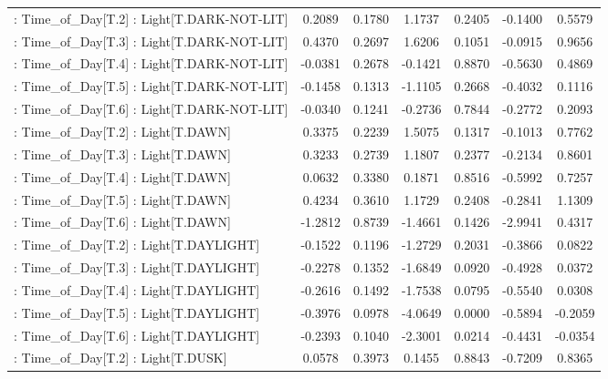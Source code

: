 \begin{longtable}{p{4cm}cccccc}
 : Time\_of\_Day[T.2] : Light[T.DARK-NOT-LIT]        &  0.2089 &    0.1780 &  1.1737 &       0.2405 & -0.1400 &  0.5579 \\
 : Time\_of\_Day[T.3] : Light[T.DARK-NOT-LIT]        &  0.4370 &    0.2697 &  1.6206 &       0.1051 & -0.0915 &  0.9656 \\
 : Time\_of\_Day[T.4] : Light[T.DARK-NOT-LIT]        & -0.0381 &    0.2678 & -0.1421 &       0.8870 & -0.5630 &  0.4869 \\
 : Time\_of\_Day[T.5] : Light[T.DARK-NOT-LIT]        & -0.1458 &    0.1313 & -1.1105 &       0.2668 & -0.4032 &  0.1116 \\
 : Time\_of\_Day[T.6] : Light[T.DARK-NOT-LIT]        & -0.0340 &    0.1241 & -0.2736 &       0.7844 & -0.2772 &  0.2093 \\
 : Time\_of\_Day[T.2] : Light[T.DAWN]                &  0.3375 &    0.2239 &  1.5075 &       0.1317 & -0.1013 &  0.7762 \\
 : Time\_of\_Day[T.3] : Light[T.DAWN]                &  0.3233 &    0.2739 &  1.1807 &       0.2377 & -0.2134 &  0.8601 \\
 : Time\_of\_Day[T.4] : Light[T.DAWN]                &  0.0632 &    0.3380 &  0.1871 &       0.8516 & -0.5992 &  0.7257 \\
 : Time\_of\_Day[T.5] : Light[T.DAWN]                &  0.4234 &    0.3610 &  1.1729 &       0.2408 & -0.2841 &  1.1309 \\
 : Time\_of\_Day[T.6] : Light[T.DAWN]                & -1.2812 &    0.8739 & -1.4661 &       0.1426 & -2.9941 &  0.4317 \\
 : Time\_of\_Day[T.2] : Light[T.DAYLIGHT]            & -0.1522 &    0.1196 & -1.2729 &       0.2031 & -0.3866 &  0.0822 \\
 : Time\_of\_Day[T.3] : Light[T.DAYLIGHT]            & -0.2278 &    0.1352 & -1.6849 &       0.0920 & -0.4928 &  0.0372 \\
 : Time\_of\_Day[T.4] : Light[T.DAYLIGHT]            & -0.2616 &    0.1492 & -1.7538 &       0.0795 & -0.5540 &  0.0308 \\
 : Time\_of\_Day[T.5] : Light[T.DAYLIGHT]            & -0.3976 &    0.0978 & -4.0649 &       0.0000 & -0.5894 & -0.2059 \\
 : Time\_of\_Day[T.6] : Light[T.DAYLIGHT]            & -0.2393 &    0.1040 & -2.3001 &       0.0214 & -0.4431 & -0.0354 \\
 : Time\_of\_Day[T.2] : Light[T.DUSK]                &  0.0578 &    0.3973 &  0.1455 &       0.8843 & -0.7209 &  0.8365 \\

\end{longtable}

